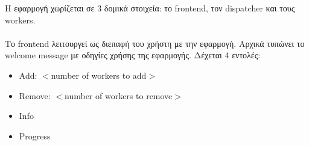 \documentclass{article}
\begin{document}
	Η εφαρμογή χωρίζεται σε 3 δομικά στοιχεία: το frontend, τον dispatcher και τους workers.\\
	\\
	Το frontend λειτουργεί ως διεπαφή του χρήστη με την εφαρμογή. Αρχικά τυπώνει το welcome message με οδηγίες χρήσης της εφαρμογής. Δέχεται 4 εντολές:
	\begin{itemize}
		\item Add: $<$number of workers to add$>$
		\item Remove: $<$number of workers to remove$>$
		\item Info
		\item Progress
	\end{itemize}
	
\end{document}
